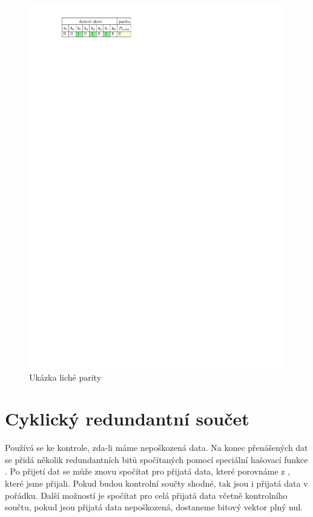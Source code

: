 \begin{figure}[H]
    \begin{center}
        \includegraphics[scale=1]{img/parita_licha}
    \end{center}
    \caption{Ukázka liché parity}
\end{figure}

\section{Cyklický redundantní součet}
Používá se ke kontrole, zda-li máme nepoškozená data. Na konec přenášených dat se přidá několik redundantních bitů spočítaných pomocí speciální hašovací funkce . Po přijetí dat se může znovu spočítat  pro přijatá data, které porovnáme z , které jsme přijali. Pokud budou kontrolní součty shodné, tak jsou i přijatá data v pořádku. Další možností je spočítat  pro celá přijatá data včetně kontrolního součtu, pokud jsou přijatá data nepoškozená, dostaneme bitový vektor plný nul.

